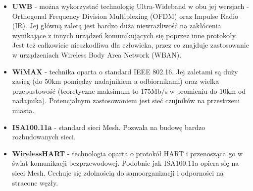 \documentclass[12pt, twoside, hidelinks, a4paper]{article}
\begin{document}
\begin{itemize}
\item \textbf{UWB} - można wykorzystać technologię Ultra-Wideband w obu jej wersjach - Orthogonal Frequency Division Multiplexing (OFDM) oraz Impulse Radio (IR). Jej główną zaletą jest bardzo duża niewrażliwość na zakłócenia wynikające z innych urządzeń komunikujących się poprzez inne protokoły. Jest też całkowicie nieszkodliwa dla człowieka, przez co znajduje zastosowanie w urządzeniach Wireless Body Area Network (WBAN).\cite{c11}
\item \textbf{WiMAX} - technika oparta o standard IEEE 802.16. Jej zaletami są duży zasięg (do 50km pomiędzy nadajnikiem a odbiornikami) oraz wielka przepustowość (teoretyczne maksimum to 175Mb/s w promieniu do 10km od nadajnika). Potencjalnym zastosowaniem jest  sieć czujników na przestrzeni miasta.\cite{c12}
\item \textbf{ISA100.11a} - standard sieci Mesh. Pozwala na budowę bardzo rozbudowanych sieci.\cite{c13}
\item \textbf{WirelessHART} - technologia oparta o protokół HART i przenosząca go w świat komunikacji bezprzewodowej. Podobnie jak ISA100.11a opiera się na sieci Mesh. Cechuje się zdolnością do samoorganizacji i odporności na stracone węzły.\cite{c13}
\end{itemize}
\end{document}
